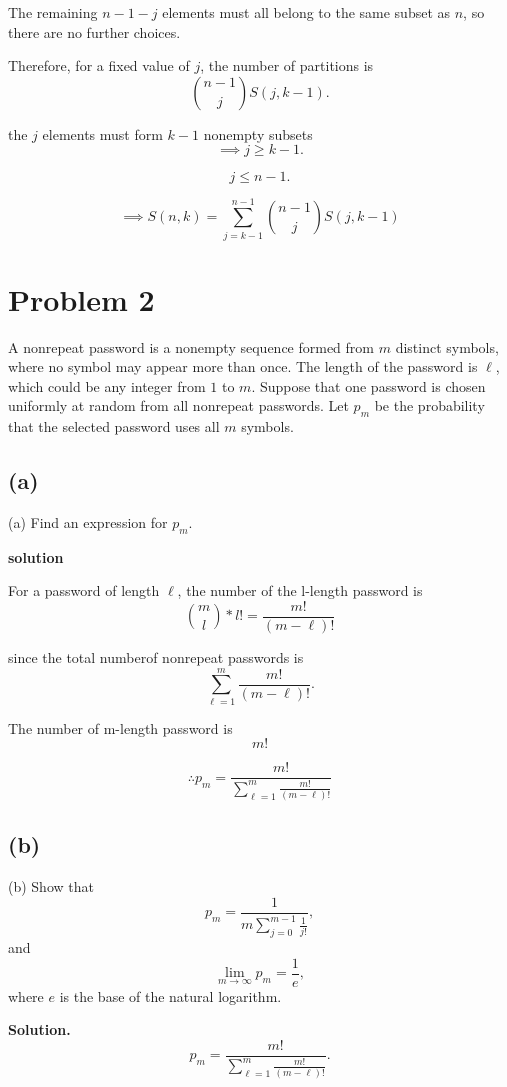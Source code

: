 \documentclass{article}
\begin{document}
The remaining $n-1-j$ elements must all belong to the same subset as $n$,
so there are no further choices.

Therefore, for a fixed value of $j$, the number of partitions is
\[
\binom{n-1}{j}S(j,k-1).
\]

the $j$ elements must form $k-1$ nonempty subsets
\[
\implies
j \geq k-1.
\]

\[
j \leq n-1.
\]

\[
\implies
S(n,k)=
\sum_{j=k-1}^{n-1}
\binom{n-1}{j}S(j,k-1)
\]





\section*{Problem 2}

A nonrepeat password is a nonempty sequence formed from $m$ distinct symbols,
where no symbol may appear more than once. The length of the password is $\ell$,
which could be any integer from $1$ to $m$. Suppose that one password is chosen
uniformly at random from all nonrepeat passwords. Let $p_m$ be the probability
that the selected password uses all $m$ symbols.

\subsection*{(a)}
(a) Find an expression for $p_m$.

\noindent\textbf{solution}

For a password of length $\ell$, the number of the l-length password is
\[
\binom{m}{l}*l!=\frac{m!}{(m-\ell)!}
\]

since the total numberof nonrepeat passwords is
\[
\sum_{\ell=1}^{m}
\frac{m!}{(m-\ell)!}.
\]

The number of m-length password is
\[
m!
\]

\[
\therefore
p_m
=
\frac{m!}
{\displaystyle\sum_{\ell=1}^{m}\frac{m!}{(m-\ell)!}}
\]

\subsection*{(b)}
(b) Show that
\[
p_m
=
\frac{1}{m\sum_{j=0}^{m-1}\frac{1}{j!}},
\]
and
\[
\lim_{m\to\infty} p_m=\frac{1}{e},
\]
where $e$ is the base of the natural logarithm.

\noindent\textbf{Solution.}
\[
p_m
=
\frac{m!}
{\displaystyle\sum_{\ell=1}^{m}\frac{m!}{(m-\ell)!}}.
\]
\end{document}
